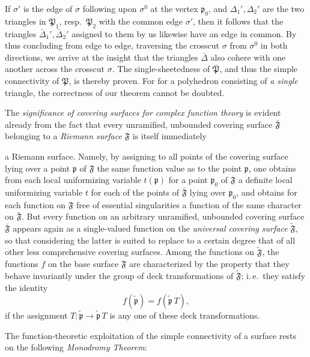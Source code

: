 \documentclass{article}
\begin{document}
If $\sigma'$ is the edge of $\sigma$ following upon $\sigma^0$ at the vertex $\mathfrak{p}_0$, and $\Delta_1', \Delta_2'$ are the two triangles in $\mathfrak{P}_1$, resp.\ $\mathfrak{P}_2$ with the common edge $\sigma'$, then it follows that the triangles $\bar{\Delta}_1', \bar{\Delta}_2'$ assigned to them by us likewise have an edge in common. By thus concluding from edge to edge, traversing the crosscut $\sigma$ from $\sigma^0$ in both directions, we arrive at the insight that the triangles $\bar{\Delta}$ also cohere with one another across the crosscut $\sigma$. The single-sheetedness of $\bar{\mathfrak{P}}$, and thus the simple connectivity of $\mathfrak{P}$, is thereby proven. For for a polyhedron consisting of \emph{a single} triangle, the correctness of our theorem cannot be doubted.

The \emph{significance of covering surfaces for complex function theory} is evident already from the fact that every unramified, unbounded covering surface $\bar{\mathfrak{F}}$ belonging to a \emph{Riemann surface} $\mathfrak{F}$ is itself immediately

a Riemann surface. Namely, by assigning to all points of the covering surface lying over a point $\mathfrak{p}$ of $\mathfrak{F}$ the same function value as to the point $\mathfrak{p}$, one obtains from each local uniformizing variable $t(\mathfrak{p})$ for a point $\mathfrak{p}_0$ of $\mathfrak{F}$ a definite local uniformizing variable $t$ for each of the points of $\bar{\mathfrak{F}}$ lying over $\mathfrak{p}_0$, and obtains for each function on $\mathfrak{F}$ free of essential singularities a function of the same character on $\bar{\mathfrak{F}}$. But every function on an arbitrary unramified, unbounded covering surface $\bar{\mathfrak{F}}$ appears again as a single-valued function on the \emph{universal covering surface} $\tilde{\mathfrak{F}}$, so that considering the latter is suited to replace to a certain degree that of all other less comprehensive covering surfaces. Among the functions on $\tilde{\mathfrak{F}}$, the functions $f$ on the base surface $\mathfrak{F}$ are characterized by the property that they behave invariantly under the group of deck transformations of $\tilde{\mathfrak{F}}$; i.\,e.\ they satisfy the identity
\[ f(\tilde{\mathfrak{p}}) = f(\tilde{\mathfrak{p}}\,T), \]
if the assignment $T\colon \tilde{\mathfrak{p}} \to \tilde{\mathfrak{p}}\,T$ is any one of these deck transformations.

The function-theoretic exploitation of the simple connectivity of a surface rests on the following \emph{Monodromy Theorem}:
\end{document}
